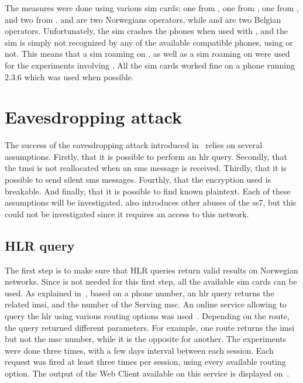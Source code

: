     The measures were done using various \gls{sim} cards: one from
    , one from , one from , and
    two from .  and  are two
    Norwegians operators, while  and  are two
    Belgian operators. Unfortunately, the  \gls{sim}
    crashes the phones when used with , and the
     \gls{sim} is simply not recognized by any of the
    available compatible phones, using  or not. This
    means that a  \gls{sim} roaming on , as
    well as a  \gls{sim} roaming on  were used
    for the experiments involving . All the \gls{sim}
    cards worked fine on a  phone running
     $2.3.6$ which was used when possible.

  \section{Eavesdropping attack}

    The success of the eavesdropping attack introduced
    in~ relies on several assumptions.
    Firstly, that it is possible to perform an \gls{hlr} query.
    Secondly, that the \gls{tmsi} is not reallocated when an \gls{sms}
    message is received. Thirdly, that it is possible to send silent
    \gls{sms} messages. Fourthly, that the encryption used is breakable.
    And finally, that it is possible to find known plaintext. Each of
    these assumptions will be investigated.
     also introduces other abuses of
    the \gls{ss7}, but this could not be investigated since it requires
    an access to this network. 

    \subsection{HLR query}

      The first step is to make sure that HLR queries return valid
      results on Norwegian networks. Since  is not
      needed for this first step, all the available \gls{sim} cards can
      be used. As explained in~, based on a phone
      number, an \gls{hlr} query returns the related \gls{imsi}, and the
      number of the Serving \gls{msc}. An online service allowing to
      query the \gls{hlr} using various routing options was
      used~\cite{hlr_lookup}. Depending on the route, the query returned
      different parameters. For example, one route returns the
      \gls{imsi} but not the \gls{msc} number, while it is the opposite
      for another. The experiments were done three times, with a few
      days interval between each session. Each request was fired at
      least three times per session, using every available routing
      option. The output of the Web Client available on this service is
      displayed on~.

